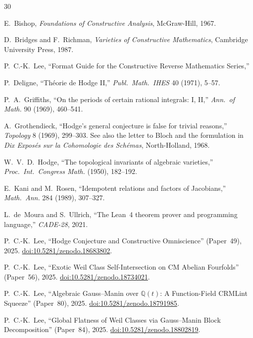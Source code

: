 \documentclass[11pt,a4paper]{article}
\theoremstyle{definition}
\theoremstyle{remark}
\newcommand{\QQ}{\mathbb{Q}}
\begin{document}

\begin{thebibliography}{30}

E.~Bishop, \emph{Foundations of Constructive Analysis},
McGraw-Hill, 1967.

D.~Bridges and F.~Richman,
\emph{Varieties of Constructive Mathematics},
Cambridge University Press, 1987.

P.~C.-K.~Lee,
``Format Guide for the Constructive Reverse Mathematics Series,''

P.~Deligne,
``Th\'eorie de Hodge II,''
\emph{Publ.\ Math.\ IHES} 40 (1971), 5--57.

P.~A.~Griffiths,
``On the periods of certain rational integrals: I, II,''
\emph{Ann.\ of Math.} 90 (1969), 460--541.

A.~Grothendieck,
``Hodge's general conjecture is false for trivial reasons,''
\emph{Topology} 8 (1969), 299--303.
See also the letter to Bloch and the formulation in
\emph{Dix Expos\'es sur la Cohomologie des Sch\'emas},
North-Holland, 1968.

W.~V.~D.~Hodge,
``The topological invariants of algebraic varieties,''
\emph{Proc.\ Int.\ Congress Math.} (1950), 182--192.

E.~Kani and M.~Rosen,
``Idempotent relations and factors of Jacobians,''
\emph{Math.\ Ann.} 284 (1989), 307--327.

L.~de~Moura and S.~Ullrich,
``The Lean~4 theorem prover and programming language,''
\emph{CADE-28}, 2021.

P.~C.-K.~Lee,
``Hodge Conjecture and Constructive Omniscience'' (Paper~49),
2025.
\href{https://doi.org/10.5281/zenodo.18683802}{doi:10.5281/zenodo.18683802}.

P.~C.-K.~Lee,
``Exotic Weil Class Self-Intersection on CM Abelian Fourfolds'' (Paper~56),
2025.
\href{https://doi.org/10.5281/zenodo.18734021}{doi:10.5281/zenodo.18734021}.

P.~C.-K.~Lee,
``Algebraic Gauss--Manin over $\QQ(t)$: A Function-Field CRMLint Squeeze'' (Paper~80),
2025.
\href{https://doi.org/10.5281/zenodo.18791985}{doi:10.5281/zenodo.18791985}.

P.~C.-K.~Lee,
``Global Flatness of Weil Classes via Gauss--Manin Block Decomposition'' (Paper~84),
2025.
\href{https://doi.org/10.5281/zenodo.18802819}{doi:10.5281/zenodo.18802819}.


\end{thebibliography}
\end{document}
